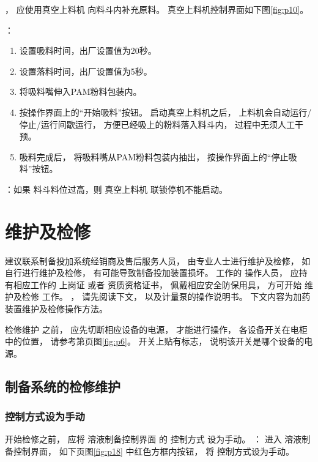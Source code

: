          

         ，
         应使用真空上料机
         向料斗内补充原料。
        真空上料机控制界面如下图\ref{fig:p10}。

         


         ：
         \begin{enumerate}
            \item 设置吸料时间，出厂设置值为20秒。
            \item 设置落料时间，出厂设置值为5秒。
            \item 将吸料嘴伸入PAM粉料包装内。
            \item 按操作界面上的“开始吸料”按钮。
            启动真空上料机之后，
            上料机会自动运行/停止/运行间歇运行，
            方便已经吸上的粉料落入料斗内，
            过程中无须人工干预。
            \item 吸料完成后，
                将吸料嘴从PAM粉料包装内抽出，
             按操作界面上的“停止吸料”按钮。
         \end{enumerate}

         ：如果 料斗料位过高，则 真空上料机 联锁停机不能启动。
         

          \newpage

\section{维护及检修}
   建议联系制备投加系统经销商及售后服务人员，
   由专业人士进行维护及检修，
   如自行进行维护及检修，
   有可能导致制备投加装置损坏。
    工作的 操作人员，
   应持有相应工作的 上岗证 或者 资质资格证书，
   佩戴相应安全防保用具，
   方可开始 维护及检修 工作。
   ，
   请先阅读下文，
   以及计量泵的操作说明书。
   下文内容为加药装置维护及检修操作方法。

     检修维护 之前，
    应先切断相应设备的电源，
    才能进行操作，
    各设备开关在电柜中的位置， 
    请参考第\pageref{sec:power-on}页图\ref{fig:p6}。
    开关上贴有标志，
    说明该开关是哪个设备的电源。

   \subsection{制备系统的检修维护}

        \subsubsection{控制方式设为手动} 
            开始检修之前，
            应将 溶液制备控制界面 的 控制方式 设为手动。
            ：
            进入 溶液制备控制界面，
            如下页图\ref{fig:p18} 中红色方框内按钮，
            将 控制方式设为手动。

